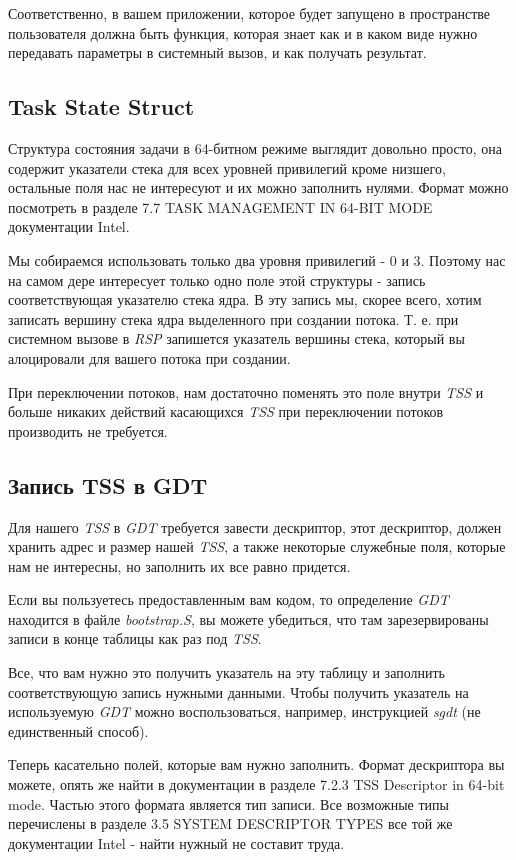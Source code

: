 Соответственно, в вашем приложении, которое будет запущено в пространстве пользователя
должна быть функция, которая знает как и в каком виде нужно передавать параметры
в системный вызов, и как получать результат.

\subsection{Task State Struct}

Структура состояния задачи в 64-битном режиме выглядит довольно просто, она содержит
указатели стека для всех уровней привилегий кроме низшего, остальные поля нас не
интересуют и их можно заполнить нулями. Формат можно посмотреть в разделе
7.7 TASK MANAGEMENT IN 64-BIT MODE документации Intel.

Мы собираемся использовать только два уровня привилегий - 0 и 3. Поэтому нас на
самом дере интересует только одно поле этой структуры - запись соответствующая
указателю стека ядра. В эту запись мы, скорее всего, хотим записать вершину
стека ядра выделенного при создании потока. Т. е. при системном вызове в \emph{RSP}
запишется указатель вершины стека, который вы алоцировали для вашего потока при
создании.

При переключении потоков, нам достаточно поменять это поле внутри \emph{TSS} и
больше никаких действий касающихся \emph{TSS} при переключении потоков производить
не требуется.

\subsection{Запись TSS в GDT}

Для нашего \emph{TSS} в \emph{GDT} требуется завести дескриптор, этот дескриптор,
должен хранить адрес и размер нашей \emph{TSS}, а также некоторые служебные поля,
которые нам не интересны, но заполнить их все равно придется.

Если вы пользуетесь предоставленным вам кодом, то определение \emph{GDT} находится
в файле \emph{bootstrap.S}, вы можете убедиться, что там зарезервированы записи в
конце таблицы как раз под \emph{TSS}.

Все, что вам нужно это получить указатель на эту таблицу и заполнить соответствующую
запись нужными данными. Чтобы получить указатель на используемую \emph{GDT} можно
воспользоваться, например, инструкцией \emph{sgdt} (не единственный способ).

Теперь касательно полей, которые вам нужно заполнить. Формат дескриптора вы можете,
опять же найти в документации в разделе 7.2.3 TSS Descriptor in 64-bit mode. Частью
этого формата является тип записи. Все возможные типы перечислены в разделе 3.5
SYSTEM DESCRIPTOR TYPES все той же документации Intel - найти нужный не составит
труда.

